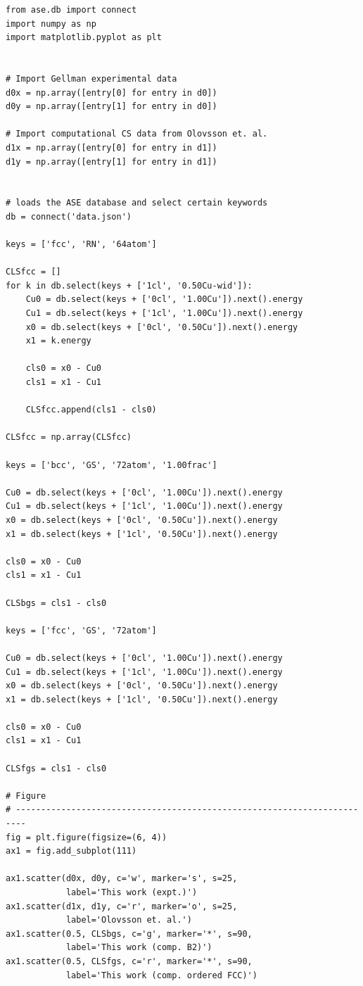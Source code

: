 \documentclass[number, sort&compress, review, 12pt]{elsarticle}
\begin{document}
\begin{verbatim}
from ase.db import connect
import numpy as np
import matplotlib.pyplot as plt


# Import Gellman experimental data
d0x = np.array([entry[0] for entry in d0])
d0y = np.array([entry[1] for entry in d0])

# Import computational CS data from Olovsson et. al.
d1x = np.array([entry[0] for entry in d1])
d1y = np.array([entry[1] for entry in d1])


# loads the ASE database and select certain keywords
db = connect('data.json')

keys = ['fcc', 'RN', '64atom']

CLSfcc = []
for k in db.select(keys + ['1cl', '0.50Cu-wid']):
    Cu0 = db.select(keys + ['0cl', '1.00Cu']).next().energy
    Cu1 = db.select(keys + ['1cl', '1.00Cu']).next().energy
    x0 = db.select(keys + ['0cl', '0.50Cu']).next().energy
    x1 = k.energy

    cls0 = x0 - Cu0
    cls1 = x1 - Cu1

    CLSfcc.append(cls1 - cls0)

CLSfcc = np.array(CLSfcc)

keys = ['bcc', 'GS', '72atom', '1.00frac']

Cu0 = db.select(keys + ['0cl', '1.00Cu']).next().energy
Cu1 = db.select(keys + ['1cl', '1.00Cu']).next().energy
x0 = db.select(keys + ['0cl', '0.50Cu']).next().energy
x1 = db.select(keys + ['1cl', '0.50Cu']).next().energy

cls0 = x0 - Cu0
cls1 = x1 - Cu1

CLSbgs = cls1 - cls0

keys = ['fcc', 'GS', '72atom']

Cu0 = db.select(keys + ['0cl', '1.00Cu']).next().energy
Cu1 = db.select(keys + ['1cl', '1.00Cu']).next().energy
x0 = db.select(keys + ['0cl', '0.50Cu']).next().energy
x1 = db.select(keys + ['1cl', '0.50Cu']).next().energy

cls0 = x0 - Cu0
cls1 = x1 - Cu1

CLSfgs = cls1 - cls0

# Figure
# ------------------------------------------------------------------------
fig = plt.figure(figsize=(6, 4))
ax1 = fig.add_subplot(111)

ax1.scatter(d0x, d0y, c='w', marker='s', s=25,
            label='This work (expt.)')
ax1.scatter(d1x, d1y, c='r', marker='o', s=25,
            label='Olovsson et. al.')
ax1.scatter(0.5, CLSbgs, c='g', marker='*', s=90,
            label='This work (comp. B2)')
ax1.scatter(0.5, CLSfgs, c='r', marker='*', s=90,
            label='This work (comp. ordered FCC)')


\end{verbatim}
\end{document}
